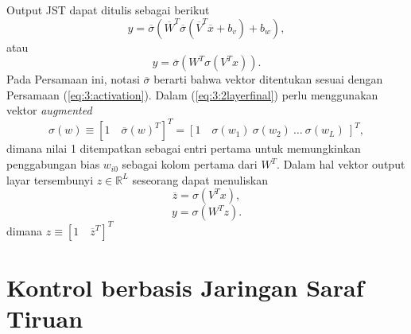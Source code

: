 \noindent Output JST dapat ditulis sebagai berikut
\begin{equation} \label{eq:3:2layer}
y = \overline{\sigma}
\left(
	\overline{W}^T\overline{\sigma}(\overline{V}^T\overline{x}+b_v)+b_w
\right),
\end{equation}
atau
\begin{equation} \label{eq:3:2layerfinal}
y = \overline{\sigma}
\left(
	W^T\sigma(V^Tx)
\right).
\end{equation}
Pada Persamaan ini, notasi $\overline{\sigma}$ berarti bahwa vektor ditentukan sesuai dengan Persamaan (\ref{eq:3:activation}). Dalam (\ref{eq:3:2layerfinal}) perlu menggunakan vektor \textit{augmented}
\begin{equation} \label{eq:3:augVector}
\sigma(w) \equiv [1\quad \overline{\sigma}(w)^T]^T = [1\quad \sigma(w_1)\ \sigma(w_2)\ \dots\ \sigma(w_L)\ ]^T,
\end{equation}
\noindent dimana nilai 1 ditempatkan sebagai entri pertama untuk memungkinkan penggabungan bias $w_{i0}$ sebagai kolom pertama dari $W^T$. Dalam hal vektor output layar tersembunyi $z\in \mathbb{R}^L$ seseorang dapat menuliskan
\begin{equation} \label{eq:3:final19}
\overline{z} = \sigma(V^Tx),
\end{equation}
\begin{equation} \label{eq:3:final20}
y = \sigma(W^Tz).
\end{equation}
\noindent dimana $z \equiv [1\quad \overline{z}^T]^T$

\section{Kontrol berbasis Jaringan Saraf Tiruan}

